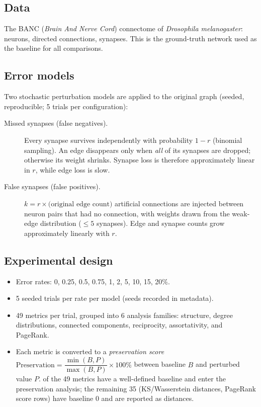 \documentclass[11pt,a4paper]{article}
\begin{document}
\subsection{Data}
The BANC (\textit{Brain And Nerve Cord}) connectome of \emph{Drosophila
melanogaster}: \baselineNeurons{} neurons, \baselineEdges{} directed
connections, \baselineSynapses{} synapses.  This is the ground-truth network
used as the baseline for all comparisons.

\subsection{Error models}
Two stochastic perturbation models are applied to the original graph
(seeded, reproducible; 5 trials per configuration):

\begin{description}
  \item[Missed synapses (false negatives).]
        Every synapse survives independently with probability $1-r$ (binomial
        sampling).  An edge disappears only when \emph{all} of its synapses
        are dropped; otherwise its weight shrinks.  Synapse loss is therefore
        approximately linear in $r$, while edge loss is slow.
  \item[False synapses (false positives).]
        $k = r \times \text{(original edge count)}$ artificial connections
        are injected between neuron pairs that had no connection, with weights
        drawn from the weak-edge distribution ($\le 5$ synapses).  Edge and
        synapse counts grow approximately linearly with $r$.
\end{description}

\subsection{Experimental design}
\begin{itemize}
  \item Error rates: 0, 0.25, 0.5, 0.75, 1, 2, 5, 10, 15, 20\%.
  \item 5 seeded trials per rate per model (seeds recorded in metadata).
  \item 49 metrics per trial, grouped into 6 analysis families: structure,
        degree distributions, connected components, reciprocity,
        assortativity, and PageRank.
  \item Each metric is converted to a \emph{preservation score}
        $\mathrm{Preservation} = \dfrac{\min(B,P)}{\max(B,P)} \times 100\%$
        between baseline $B$ and perturbed value $P$.  \nPresMetrics{} of
        the 49 metrics have a well-defined baseline and enter the
        preservation analysis; the remaining 35 (KS/Wasserstein distances,
        PageRank score rows) have baseline 0 and are reported as distances.
\end{itemize}
\end{document}
